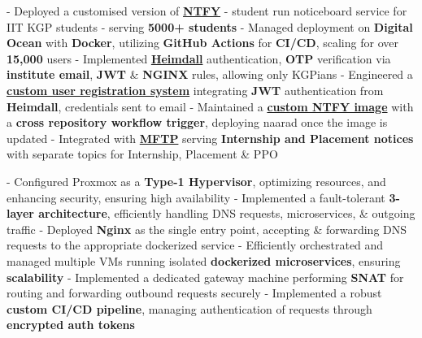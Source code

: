 \documentclass[a4paper,10pt]{extarticle} %
\begin{document}
\begin{description}[style=nextline, font=$\bullet$\hspace{2mm}\normalsize]
 \item[{\href{https://naarad.metakgp.org}{Naarad}} | Golang, Nginx, Digital Ocean, GitHub Actions, Docker ] 
- Deployed a customised version of \href{https://ntfy.sh/app}{\textbf{NTFY}} - student run noticeboard service for IIT KGP students - serving \textbf{5000+ students} \newline
- Managed deployment on \textbf{Digital Ocean} with \textbf{Docker}, utilizing \textbf{GitHub Actions} for \textbf{CI/CD}, scaling for over \textbf{15,000} users \newline
- Implemented \href{https://heimdall.metakgp.org}{\textbf{Heimdall}} authentication, \textbf{OTP} verification via \textbf{institute email}, \textbf{JWT} \& \textbf{NGINX} rules, allowing only KGPians \newline
- Engineered a \href{https://naarad-signup.metakgp.org}{\textbf{custom user registration system}} integrating \textbf{JWT} authentication from \textbf{Heimdall}, credentials sent to email \newline
- Maintained a \href{https://github.com/metakgp/naarad-ntfy}{\textbf{custom NTFY image}} with a \textbf{cross repository workflow trigger}, deploying naarad once the image is updated \newline
- Integrated with \href{https://github.com/metakgp/mftp}{\textbf{MFTP}} serving \textbf{Internship and Placement notices} with separate topics for Internship, Placement \& PPO

 \item[\href{https://github.com/tsg-iitkgp/ops-architecture}{On-Premise Server Setup \& Management} | Proxmox, Nginx, Docker ] 
- Configured Proxmox as a \textbf{Type-1 Hypervisor}, optimizing resources, and enhancing security, ensuring high availability \newline
- Implemented a fault-tolerant \textbf{3-layer architecture}, efficiently handling DNS requests, microservices, \& outgoing traffic \newline
- Deployed \textbf{Nginx} as the single entry point, accepting \& forwarding DNS requests to the appropriate dockerized service \newline
- Efficiently orchestrated and managed multiple VMs running isolated \textbf{dockerized microservices}, ensuring \textbf{scalability} \newline
- Implemented a dedicated gateway machine performing \textbf{SNAT} for routing and forwarding outbound requests securely \newline
- Implemented a robust \textbf{custom CI/CD pipeline}, managing authentication of requests through \textbf{encrypted auth tokens}


\end{description}
\end{document}
